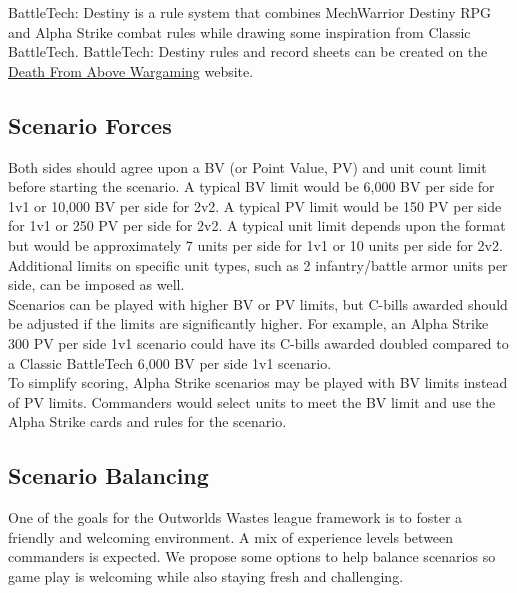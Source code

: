 \documentclass[UTF8]{article}
\begin{document}
BattleTech: Destiny is a rule system that combines MechWarrior Destiny RPG and Alpha Strike combat rules while drawing some inspiration from Classic BattleTech.
BattleTech: Destiny rules and record sheets can be created on the \href{https://dfawargaming.com}{Death From Above Wargaming} website.

\subsection{Scenario Forces}

Both sides should agree upon a BV (or Point Value, PV) and unit count limit before starting the scenario.
A typical BV limit would be 6,000 BV per side for 1v1 or 10,000 BV per side for 2v2.
A typical PV limit would be 150 PV per side for 1v1 or 250 PV per side for 2v2.
A typical unit limit depends upon the format but would be approximately 7 units per side for 1v1 or 10 units per side for 2v2.
Additional limits on specific unit types, such as 2 infantry/battle armor units per side, can be imposed as well.\\

Scenarios can be played with higher BV or PV limits, but C-bills awarded should be adjusted if the limits are significantly higher.
For example, an Alpha Strike 300 PV per side 1v1 scenario could have its C-bills awarded doubled compared to a Classic BattleTech 6,000 BV per side 1v1 scenario.\\

To simplify scoring, Alpha Strike scenarios may be played with BV limits instead of PV limits.
Commanders would select units to meet the BV limit and use the Alpha Strike cards and rules for the scenario.

\subsection{Scenario Balancing}

One of the goals for the Outworlds Wastes league framework is to foster a friendly and welcoming environment.
A mix of experience levels between commanders is expected.
We propose some options to help balance scenarios so game play is welcoming while also staying fresh and challenging.\\
\end{document}
